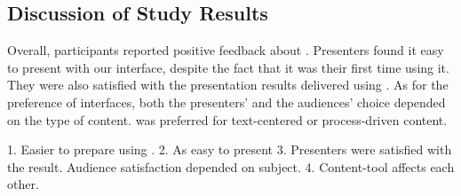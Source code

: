 \subsection{Discussion of Study Results}
Overall, participants reported positive feedback about \interface. Presenters found it easy to present with our interface, despite the fact that it was their first time using it. They were also satisfied with the presentation results delivered using \interface. As for the preference of interfaces, both the presenters' and the audiences' choice depended on the type of content. \interface was preferred for text-centered or process-driven content. 

1. Easier to prepare using \interface.
2. As easy to present
3. Presenters were satisfied with the result. Audience satisfaction depended on subject. 
4. Content-tool affects each other.

